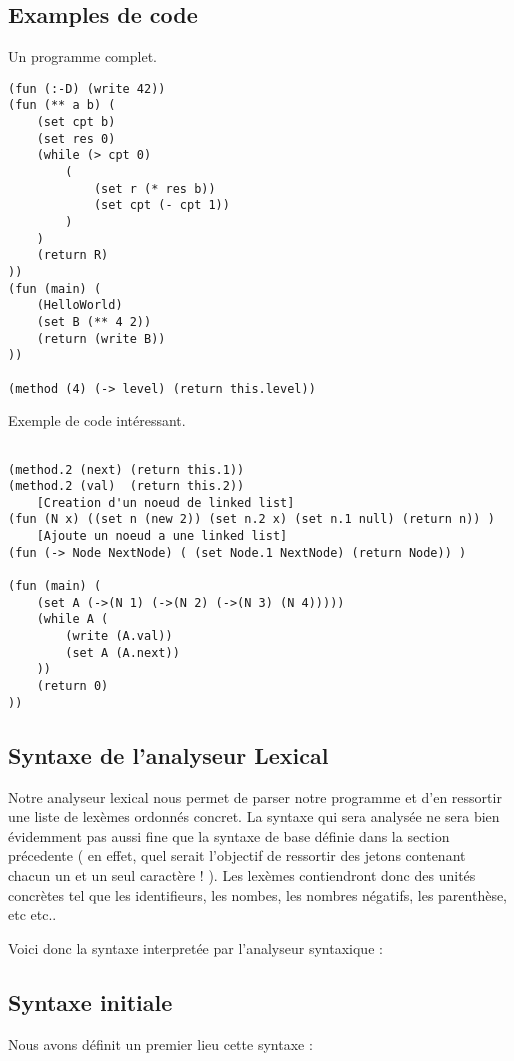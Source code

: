 \subsection{Examples de code}
Un programme complet. 
\begin{verbatim}
(fun (:-D) (write 42))
(fun (** a b) (
	(set cpt b)
	(set res 0)
	(while (> cpt 0) 
		(
			(set r (* res b))
			(set cpt (- cpt 1))	
		)
	)
	(return R)
))
(fun (main) (
	(HelloWorld)
	(set B (** 4 2))
	(return (write B))
))

(method (4) (-> level) (return this.level))

\end{verbatim}
Exemple de code intéressant. 
\begin{verbatim}

(method.2 (next) (return this.1))
(method.2 (val)  (return this.2))
	[Creation d'un noeud de linked list]
(fun (N x) ((set n (new 2)) (set n.2 x) (set n.1 null) (return n)) )
	[Ajoute un noeud a une linked list] 
(fun (-> Node NextNode) ( (set Node.1 NextNode) (return Node)) )

(fun (main) (
	(set A (->(N 1) (->(N 2) (->(N 3) (N 4)))))
	(while A (
		(write (A.val))
		(set A (A.next))
	))
	(return 0)
))
\end{verbatim}

\subsection{Syntaxe de l'analyseur Lexical}

Notre analyseur lexical nous permet de parser notre programme et d'en ressortir une liste de lexèmes ordonnés concret. 
La syntaxe qui sera analysée ne sera bien évidemment pas aussi fine que la syntaxe de base définie dans la section précedente 
( en effet, quel serait l'objectif de ressortir des jetons contenant chacun un et un seul caractère ! ). 
Les lexèmes contiendront donc des unités concrètes tel que les identifieurs, les nombes, les nombres négatifs, les parenthèse, etc etc..


Voici donc la syntaxe interpretée par l'analyseur syntaxique :

\subsection{Syntaxe initiale}
Nous avons définit un premier lieu cette syntaxe : 

